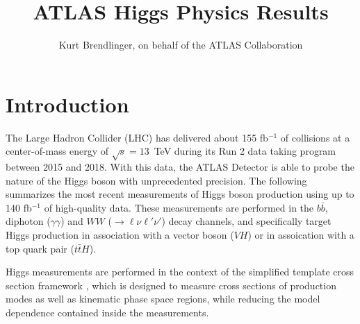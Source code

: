 \documentclass{moriond}
\begin{document}
\linenumbers

\vspace*{4cm}
\title{ATLAS Higgs Physics Results}

\author{ Kurt Brendlinger, on behalf of the ATLAS Collaboration }

\address{~\\DESY, Notkestra\ss e 85,\\ 22607 Hamburg, Germany}

\maketitle{}

\section{Introduction}

The Large Hadron Collider (LHC) \cite{Evans:2008zzb} has delivered about 155 fb$^{-1}$ of
collisions at a center-of-mass energy of $\sqrt{s}=13$~TeV during its Run 2 data taking program
between 2015 and 2018.
With this data, the
ATLAS Detector \cite{PERF-2007-01} is able to probe the nature of the Higgs boson with unprecedented
precision. The following summarizes the most recent measurements of Higgs boson production using up
to 140 fb$^{-1}$ of high-quality data. These measurements are performed in the $b\bar b$,
diphoton ($\gamma\gamma$) and $WW$ (${\rightarrow}\ell\nu\ell'\nu'$) decay channels, and specifically
target Higgs production in association with a vector boson ($VH$) or in assoication with a top
quark pair ($t\bar tH$).

Higgs measurements are performed in the context of the simplified template cross section
framework \cite{deFlorian:2016spz,Badger:2016bpw},
which is designed to measure cross sections of production modes as well as kinematic phase space
regions, while reducing the model dependence contained inside the measurements.
\end{document}
